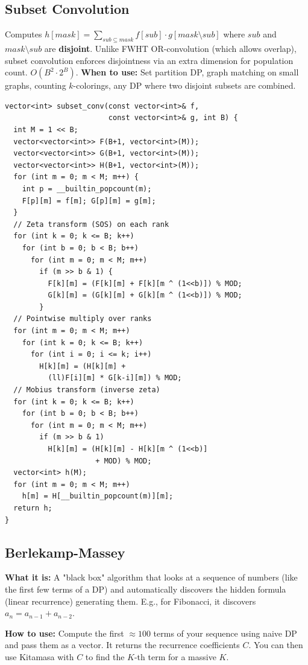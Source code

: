 \subsection{Subset Convolution}
Computes $h[mask] = \sum_{sub \subseteq mask} f[sub] \cdot g[mask \setminus sub]$ where $sub$ and $mask \setminus sub$ are \textbf{disjoint}. Unlike FWHT OR-convolution (which allows overlap), subset convolution enforces disjointness via an extra dimension for population count. $O(B^2 \cdot 2^B)$.
\textbf{When to use:} Set partition DP, graph matching on small graphs, counting $k$-colorings, any DP where two disjoint subsets are combined.
\begin{verbatim}
vector<int> subset_conv(const vector<int>& f,
                        const vector<int>& g, int B) {
  int M = 1 << B;
  vector<vector<int>> F(B+1, vector<int>(M));
  vector<vector<int>> G(B+1, vector<int>(M));
  vector<vector<int>> H(B+1, vector<int>(M));
  for (int m = 0; m < M; m++) {
    int p = __builtin_popcount(m);
    F[p][m] = f[m]; G[p][m] = g[m];
  }
  // Zeta transform (SOS) on each rank
  for (int k = 0; k <= B; k++)
    for (int b = 0; b < B; b++)
      for (int m = 0; m < M; m++)
        if (m >> b & 1) {
          F[k][m] = (F[k][m] + F[k][m ^ (1<<b)]) % MOD;
          G[k][m] = (G[k][m] + G[k][m ^ (1<<b)]) % MOD;
        }
  // Pointwise multiply over ranks
  for (int m = 0; m < M; m++)
    for (int k = 0; k <= B; k++)
      for (int i = 0; i <= k; i++)
        H[k][m] = (H[k][m] +
          (ll)F[i][m] * G[k-i][m]) % MOD;
  // Mobius transform (inverse zeta)
  for (int k = 0; k <= B; k++)
    for (int b = 0; b < B; b++)
      for (int m = 0; m < M; m++)
        if (m >> b & 1)
          H[k][m] = (H[k][m] - H[k][m ^ (1<<b)]
                     + MOD) % MOD;
  vector<int> h(M);
  for (int m = 0; m < M; m++)
    h[m] = H[__builtin_popcount(m)][m];
  return h;
}
\end{verbatim}

\subsection{Berlekamp-Massey}
\textbf{What it is:} A "black box" algorithm that looks at a sequence of numbers (like the first few terms of a DP) and automatically discovers the hidden formula (linear recurrence) generating them. E.g., for Fibonacci, it discovers $a_n = a_{n-1} + a_{n-2}$.

\textbf{How to use:} Compute the first $\approx 100$ terms of your sequence using naive DP and pass them as a vector. It returns the recurrence coefficients $C$. You can then use Kitamasa with $C$ to find the $K$-th term for a massive $K$.

